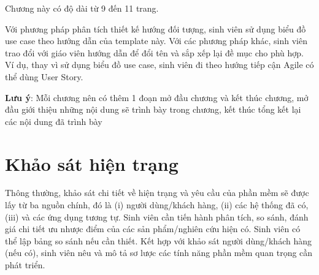 \documentclass[../DoAn.tex]{subfiles}
\begin{document}
Chương này có độ dài từ 9 đến 11 trang.

Với phương pháp phân tích thiết kế hướng đối tượng, sinh viên sử dụng biểu đồ use case theo hướng dẫn của template này. Với các phương pháp khác, sinh viên trao đổi với giáo viên hướng dẫn để đổi tên và sắp xếp lại đề mục cho phù hợp. Ví dụ, thay vì sử dụng biểu đồ use case, sinh viên đi theo hướng tiếp cận Agile có thể dùng User Story.


\textbf{Lưu ý}: Mỗi chương nên có thêm 1 đoạn mở đầu chương và kết thúc chương, mở đầu giới thiệu những nội dung sẽ trình bày trong chương, kết thúc tổng kết lại các nội dung đã trình bày

\section{Khảo sát hiện trạng}
\label{section:2.1}
Thông thường, khảo sát chi tiết về hiện trạng và yêu cầu của phần mềm sẽ được lấy từ ba nguồn chính, đó là (i) người dùng/khách hàng, (ii) các hệ thống đã có, (iii) và các ứng dụng tương tự.
Sinh viên cần tiến hành phân tích, so sánh, đánh giá chi tiết ưu nhược điểm của các sản phẩm/nghiên cứu hiện có. Sinh viên có thể lập bảng so sánh nếu cần thiết. Kết hợp với khảo sát người dùng/khách hàng (nếu có), sinh viên nêu và mô tả sơ lược các tính năng phần mềm quan trọng cần phát triển.
\end{document}
